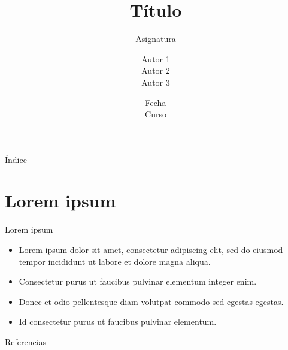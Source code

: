\documentclass[spanish]{beamer}
\title{Título}
\subtitle{Asignatura}
\author{
  Autor 1 \texorpdfstring{\\}{}
  Autor 2 \texorpdfstring{\\}{}
  Autor 3
}
\institute{\normalsize Universidad}
\date{Fecha\texorpdfstring{\\}{} \small Curso}
\begin{document}
\maketitle

\begin{frame}{Índice}
  \tableofcontents
\end{frame}

\section{Lorem ipsum}
\begin{frame}{Lorem ipsum}
  \begin{itemize}
    \item Lorem ipsum dolor sit amet, consectetur adipiscing elit, sed do eiusmod tempor incididunt ut labore et dolore magna aliqua.
    \item Consectetur purus ut faucibus pulvinar elementum integer enim.
    \item Donec et odio pellentesque diam volutpat commodo sed egestas egestas.
    \item Id consectetur purus ut faucibus pulvinar elementum.
  \end{itemize}
\end{frame}

\begin{frame}[t,allowframebreaks]{Referencias}
  \printbibliography[heading=none]
\end{frame}
\end{document}
